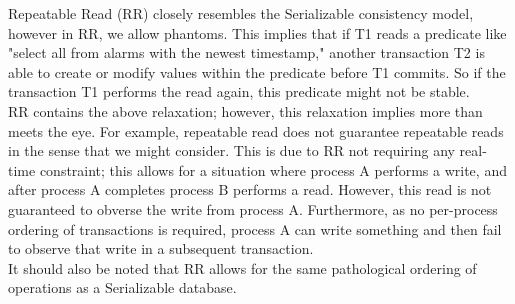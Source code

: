 \documentclass[a4paper,10pt,titlepage]{report}
\begin{document}
Repeatable Read (RR) closely resembles the Serializable consistency model, however in RR, we allow phantoms. This implies that if T1 reads a predicate like "select all from alarms with the newest timestamp," another transaction T2 is able to create or modify values within the predicate before T1 commits. So if the transaction T1 performs the read again, this predicate might not be stable.
\\ \vspace{5mm}
RR contains the above relaxation; however, this relaxation implies more than meets the eye. For example, repeatable read does not guarantee repeatable reads in the sense that we might consider. This is due to RR not requiring any real-time constraint; this allows for a situation where process A performs a write, and after process A completes process B performs a read. However, this read is not guaranteed to obverse the write from process A. Furthermore, as no per-process ordering of transactions is required, process A can write something and then fail to observe that write in a subsequent transaction.
\\ \vspace{5mm}
It should also be noted that RR allows for the same pathological ordering of operations as a Serializable database.
\vspace{2mm}

\vspace{2mm}

\newpage
\end{document}
